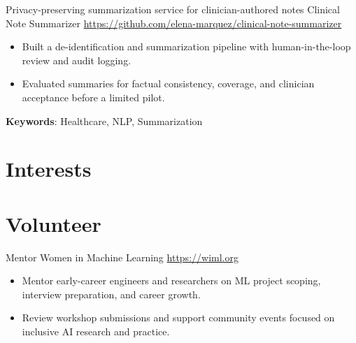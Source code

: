 \documentclass[a4paper, serif, 10pt]{moderncv}
\begin{document}
        {Privacy-preserving summarization service for clinician-authored notes}
        {Clinical Note Summarizer}
        {\url{https://github.com/elena-marquez/clinical-note-summarizer}}
        {}
        {\begin{itemize}
\item Built a de-identification and summarization pipeline with human-in-the-loop review and audit logging.
\item Evaluated summaries for factual consistency, coverage, and clinician acceptance before a limited pilot.
\end{itemize}
\textbf{Keywords}: Healthcare, NLP, Summarization}
\section{Interests}

\section{Volunteer}

        {Mentor}
        {Women in Machine Learning}
        {\url{https://wiml.org}}
        {}
        {\begin{itemize}
\item Mentor early-career engineers and researchers on ML project scoping, interview preparation, and career growth.
\item Review workshop submissions and support community events focused on inclusive AI research and practice.
\end{itemize}}
    
\end{document}
